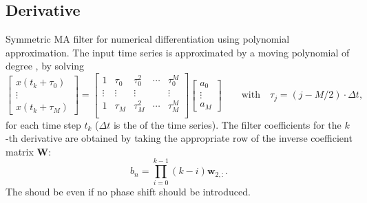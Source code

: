 \subsection{Derivative}
Symmetric MA filter for numerical differentiation using polynomial approximation. The input time series is approximated by a moving polynomial of degree , by solving
\begin{equation}
  \begin{bmatrix} x(t_k+\tau_0) \\ \vdots \\ x(t_k+\tau_M) \end{bmatrix}
  =
  \begin{bmatrix}
  1      & \tau_0 & \tau_0^2 & \cdots & \tau_0^M \\
  \vdots & \vdots & \vdots   &        & \vdots   \\
  1      & \tau_M & \tau_M^2 & \cdots & \tau_M^M \\
  \end{bmatrix}%
  \begin{bmatrix}
  a_0 \\ \vdots \\ a_M
  \end{bmatrix}
  \qquad\text{with}\quad
  \tau_j =  (j-M/2)\cdot \Delta t,
\end{equation}
for each time step $t_k$ ($\Delta t$ is the  of the time series).
The filter coefficients for the $k$-th derivative are obtained by taking the appropriate row of the inverse coefficient matrix $\mathbf{W}$:
\begin{equation}
  b_n = \prod_{i=0}^{k-1} (k-i) \mathbf{w}_{2,:}.
\end{equation}
The  shoud be even if no phase shift should be introduced.


